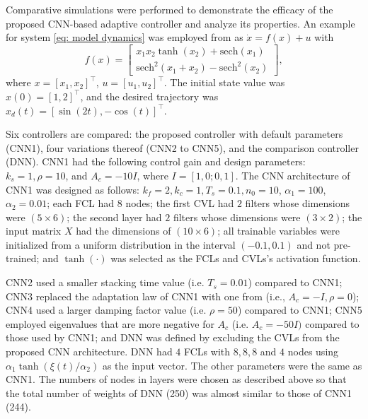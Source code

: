 \documentclass{l4dc2025}
\begin{document}
Comparative simulations were performed to demonstrate the efficacy of the proposed CNN-based adaptive controller and analyze its properties. 
An example for system \eqref{eq: model dynamics} was employed from \cite{DixonDNN} as 
$\dot x = f(x) + u$ with
\begin{equation}
    f(x)
     = 
    \begin{bmatrix}
        x_1x_2\tanh(x_2)+\text{sech}(x_1)\\
        \text{sech}^2 (x_1+x_2) -\text{sech}^2(x_2)
    \end{bmatrix},
    \label{eq: sim dynamics}
\end{equation}
where $x=[x_1,x_2]^\top  $, $u=[u_1,u_2]^\top$. 
The initial state value was $x(0)=[1,2]^\top  $, and the desired trajectory was $x_d(t) = [\sin(2t),-\cos(t)]^\top  $. 

Six controllers are compared: the proposed controller with default parameters (CNN1), four variations thereof (CNN2 to CNN5), and the comparison controller (DNN). CNN1 had the following control gain and design parameters: $k_s=1, \rho=10$, and $A_c=-10I$, where $I = [1,0;0,1]$. The CNN architecture of CNN1 was designed as follows: $k_f=2, k_c=1, T_s=0.1, n_0 = 10$, $\alpha_1 = 100$, $\alpha_2=0.01$; each FCL had $8$ nodes; the first CVL had $2$ filters whose dimensions were $(5\times 6)$; the second layer had $2$ filters whose dimensions were $(3\times2)$; the input matrix $X$ had the dimensions of $(10\times 6)$; all trainable variables were initialized from a uniform distribution in the interval $(-0.1,0.1)$ and not pre-trained; and $\tanh(\cdot)$ was selected as the FCLs and CVLs's activation function.

CNN2 used a smaller stacking time value (i.e. $T_s=0.01$) compared to CNN1; CNN3 replaced the adaptation law of CNN1 with one from \cite{DixonDNN} (i.e., $A_c=-I, \rho = 0$); CNN4 used a larger damping factor value (i.e. $\rho=50$) compared to CNN1; CNN5 employed eigenvalues that are more negative for $A_c$ (i.e. $A_c=-50I)$ compared to those used by CNN1; and DNN was defined by excluding the CVLs from the proposed CNN architecture. 
DNN had $4$ FCLs with $8,8,8$ and $4$ nodes 
using $\alpha_1\tanh(\xi(t)/\alpha_2)$ as the input vector. The other parameters were the same as CNN1. 
The numbers of nodes in layers were chosen as described above so that the total number of weights of DNN (250) was almost similar to those of CNN1 (244).
\end{document}

